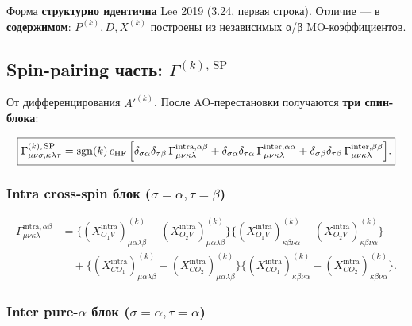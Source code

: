 \documentclass[11pt, a4paper]{article}
\theoremstyle{definition}
\newcommand{\sgn}{\operatorname{sgn}}
\newcommand{\HF}{\text{HF}}
\begin{document}
Форма \textbf{структурно идентична} Lee 2019 (3.24, первая строка). Отличие --- в \textbf{содержимом}: $P^{(k)}, D, X^{(k)}$ построены из независимых α/β MO-коэффициентов.

\subsection{Spin-pairing часть: $\Gamma^{(k),\,\text{SP}}$}

От дифференцирования $A'^{(k)}$. После AO-перестановки получаются \textbf{три спин-блока}:

\begin{equation}
    \boxed{
        \Gamma^{(k),\,\text{SP}}_{\mu\nu\sigma, \kappa\lambda\tau} = \sgn(k)\, c_{\HF}\, \Bigl[ \delta_{\sigma\alpha} \delta_{\tau\beta}\, \Gamma^{\text{intra},\alpha\beta}_{\mu\nu\kappa\lambda} + \delta_{\sigma\alpha} \delta_{\tau\alpha}\, \Gamma^{\text{inter},\alpha\alpha}_{\mu\nu\kappa\lambda} + \delta_{\sigma\beta} \delta_{\tau\beta}\, \Gamma^{\text{inter},\beta\beta}_{\mu\nu\kappa\lambda} \Bigr].
    }
\end{equation}

\subsubsection{Intra cross-spin блок ($\sigma = \alpha, \tau = \beta$)}

\begin{equation}
    \begin{aligned}
        \Gamma^{\text{intra},\alpha\beta}_{\mu\nu\kappa\lambda} &= \bigl\{ (X^{\text{intra}}_{O_1 V})^{(k)}_{\mu\alpha\lambda\beta} - (X^{\text{intra}}_{O_2 V})^{(k)}_{\mu\alpha\lambda\beta} \bigr\}\bigl\{ (X^{\text{intra}}_{O_1 V})^{(k)}_{\kappa\beta\nu\alpha} - (X^{\text{intra}}_{O_2 V})^{(k)}_{\kappa\beta\nu\alpha} \bigr\} \\
        &\quad + \bigl\{ (X^{\text{intra}}_{CO_1})^{(k)}_{\mu\alpha\lambda\beta} - (X^{\text{intra}}_{CO_2})^{(k)}_{\mu\alpha\lambda\beta} \bigr\}\bigl\{ (X^{\text{intra}}_{CO_1})^{(k)}_{\kappa\beta\nu\alpha} - (X^{\text{intra}}_{CO_2})^{(k)}_{\kappa\beta\nu\alpha} \bigr\}.
    \end{aligned}
\end{equation}

\subsubsection{Inter pure-$\alpha$ блок ($\sigma = \alpha, \tau = \alpha$)}
\end{document}
